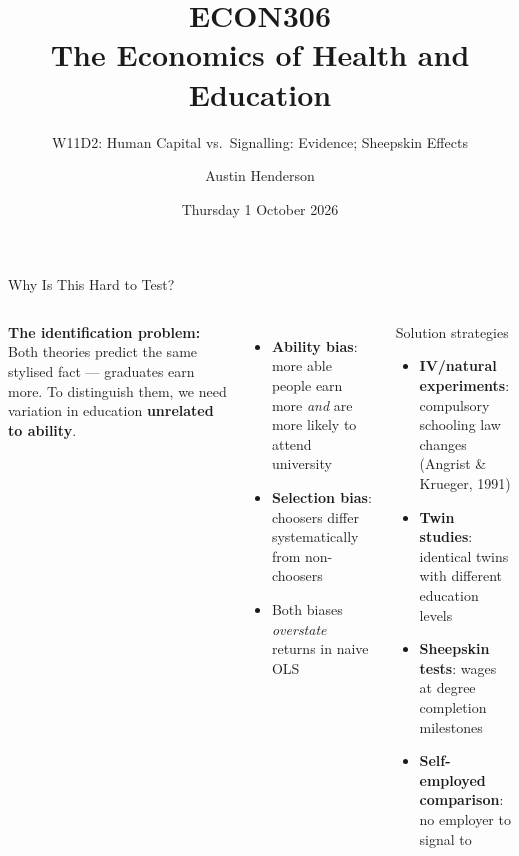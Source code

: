 \documentclass[aspectratio=169, 12pt]{beamer}
\title[ECON306: W11D2 — HC vs. Signalling Evidence]{ECON306\\The Economics of Health and Education}
\subtitle{W11D2: Human Capital vs.\ Signalling: Evidence; Sheepskin Effects}
\author{Austin Henderson}
\institute{Department of Economics\\University of Otago}
\date{Thursday 1 October 2026}
\begin{document}
\begin{frame}[plain]
  \titlepage
\end{frame}



\begin{frame}{Why Is This Hard to Test?}
  \begin{columns}
      \small \textbf{The identification problem:} Both theories predict the same stylised fact
      --- graduates earn more. To distinguish them, we need variation in education
      \textbf{unrelated to ability}.
      \begin{itemize}
        \item \textbf{Ability bias}: more able people earn more \emph{and} are more likely
              to attend university
        \item \textbf{Selection bias}: choosers differ systematically from non-choosers
        \item Both biases \emph{overstate} returns in naive OLS
      \end{itemize}
      \begin{alertblock}{Solution strategies}
        \small
        \begin{itemize}
          \item \textbf{IV/natural experiments}: compulsory schooling law changes (Angrist \& Krueger, 1991)
          \item \textbf{Twin studies}: identical twins with different education levels
          \item \textbf{Sheepskin tests}: wages at degree completion milestones
          \item \textbf{Self-employed comparison}: no employer to signal to
        \end{itemize}
      \end{alertblock}
  \end{columns}
\end{frame}
\end{document}
